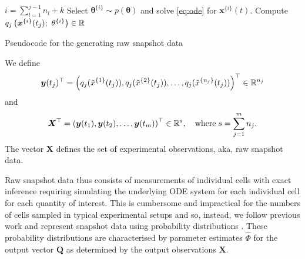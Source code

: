 \begin{algorithm}[H]
	\footnotesize
	\texttt{\\}
	\begin{algorithmic}
               \State $i=\sum_{l=1}^{j-1} n_l + k$
               \State Select $\boldsymbol{\theta}^{\{i\}} \sim p(\boldsymbol{\theta})$ and solve \eqref{eq:ode} for $\boldsymbol{x}^{\{i\}}(t)$.
               \State Compute $q_j\left( \boldsymbol{x}^{\{i\}}(t_j); \ \theta^{\{i\}} \right) \in \mathbb{R}$
            \EndFor
        \EndFor
	\end{algorithmic}
	\caption{Pseudocode for the generating raw snapshot data}\label{alg:raw}
\end{algorithm}
We define
\begin{equation}
\boldsymbol{y}(t_j)^\top = \left( q_j(\tilde x^{\{1\}}(t_j)), q_j(\tilde x^{\{2\}}(t_j)), \dots, q_j(\tilde x^{\{n_j\}}(t_j))  \right)^\top  \in \mathbb{R}^{n_j}
\end{equation}
and
\begin{equation}
  \boldsymbol{X}^\top = \left( \boldsymbol{y}(t_1), \boldsymbol{y}(t_2), \dots, \boldsymbol{y}(t_m) \right)^\top \in \mathbb{R}^s,
                        \quad \hbox{where} \; s = \sum_{j=1}^m n_j.
\end{equation}
The vector $\boldsymbol{X}$ defines the set of experimental observations, aka, raw snapshot data.

Raw snapshot data thus consists of measurements of individual cells with exact inference requiring simulating the underlying ODE system for each individual cell for each quantity of interest. This is cumbersome and impractical for the numbers of cells sampled in typical experimental setups and so, instead, we follow previous work and represent snapshot data using probability distributions \cite{hasenauer2011identification,hasenauer2014ode,loos2018hierarchical,dixit2018maximum}.
These probability distributions are characterised by parameter estimates $\hat{\Phi}$ for the output vector $\boldsymbol{Q}$ as determined by the output observations $\boldsymbol{X}$.

